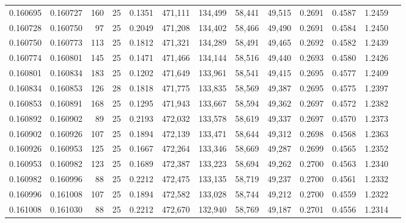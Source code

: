\begin{tabular}{rrrrrrrrrrrrr}
0.160695 & 0.160727 & 160 &  25 &                                     0.1351 & 471,111 & 134,499 &  58,441 &  49,515 & 0.2691 & 0.4587 & 1.2459 \\
0.160728 & 0.160750 &  97 &  25 &                                     0.2049 & 471,208 & 134,402 &  58,466 &  49,490 & 0.2691 & 0.4584 & 1.2450 \\
0.160750 & 0.160773 & 113 &  25 &                                     0.1812 & 471,321 & 134,289 &  58,491 &  49,465 & 0.2692 & 0.4582 & 1.2439 \\
0.160774 & 0.160801 & 145 &  25 &                                     0.1471 & 471,466 & 134,144 &  58,516 &  49,440 & 0.2693 & 0.4580 & 1.2426 \\
0.160801 & 0.160834 & 183 &  25 &                                     0.1202 & 471,649 & 133,961 &  58,541 &  49,415 & 0.2695 & 0.4577 & 1.2409 \\
0.160834 & 0.160853 & 126 &  28 &                                     0.1818 & 471,775 & 133,835 &  58,569 &  49,387 & 0.2695 & 0.4575 & 1.2397 \\
0.160853 & 0.160891 & 168 &  25 &                                     0.1295 & 471,943 & 133,667 &  58,594 &  49,362 & 0.2697 & 0.4572 & 1.2382 \\
0.160892 & 0.160902 &  89 &  25 &                                     0.2193 & 472,032 & 133,578 &  58,619 &  49,337 & 0.2697 & 0.4570 & 1.2373 \\
0.160902 & 0.160926 & 107 &  25 &                                     0.1894 & 472,139 & 133,471 &  58,644 &  49,312 & 0.2698 & 0.4568 & 1.2363 \\
0.160926 & 0.160953 & 125 &  25 &                                     0.1667 & 472,264 & 133,346 &  58,669 &  49,287 & 0.2699 & 0.4565 & 1.2352 \\
0.160953 & 0.160982 & 123 &  25 &                                     0.1689 & 472,387 & 133,223 &  58,694 &  49,262 & 0.2700 & 0.4563 & 1.2340 \\
0.160982 & 0.160996 &  88 &  25 &                                     0.2212 & 472,475 & 133,135 &  58,719 &  49,237 & 0.2700 & 0.4561 & 1.2332 \\
0.160996 & 0.161008 & 107 &  25 &                                     0.1894 & 472,582 & 133,028 &  58,744 &  49,212 & 0.2700 & 0.4559 & 1.2322 \\
0.161008 & 0.161030 &  88 &  25 &                                     0.2212 & 472,670 & 132,940 &  58,769 &  49,187 & 0.2701 & 0.4556 & 1.2314 \\

\end{tabular}
